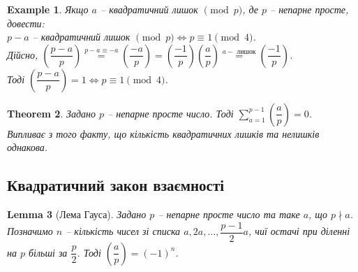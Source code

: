 \documentclass[a4paper, 14pt]{extarticle}
\theoremstyle{theoremdd}
\newtheorem{theorem}{Theorem}[subsection]
\theoremstyle{theoremdd}
\theoremstyle{theoremdd}
\theoremstyle{theoremdd}
\newtheorem{example}[theorem]{Example}
\theoremstyle{theoremdd}
\theoremstyle{theoremdd}
\theoremstyle{theoremdd}
\newtheorem{lemma}[theorem]{Lemma}
\theoremstyle{theoremdd}
\begin{document}
\begin{example}
Якщо $a$ -- квадратичний лишок $\pmod p$, де $p$ -- непарне просте, довести:\\
$p-a$ -- квадратичний лишок $\pmod p \iff p \equiv 1 \pmod 4$.\\
Дійсно, $\left( \dfrac{p-a}{p} \right) \overset{p-a \equiv -a}{=} \left( \dfrac{-a}{p} \right) = \left( \dfrac{-1}{p} \right) \left( \dfrac{a}{p} \right) \overset{a - \text{ лишок}}{=} \left( \dfrac{-1}{p} \right)$.\\
Тоді $\left( \dfrac{p-a}{p} \right) =1 \iff p \equiv 1 \pmod 4$.
\end{example}

\iffalse
\begin{example}
Знайти всі квадратичні лишкі $\pmod {19}$.
\end{example}
\fi

\begin{theorem}
Задано $p$ -- непарне просте число. Тоді $\displaystyle\sum_{a=1}^{p-1} \left( \dfrac{a}{p} \right) = 0$.\\
\textit{Випливає з того факту, що кількість квадратичних лишків та нелишків однакова.}
\end{theorem}

\subsection{Квадратичний закон взаємності}
\begin{lemma}[Лема Гауса]
Задано $p$ -- непарне просте число та таке $a$, що $p \nmid a$. Позначимо $n$ -- кількість чисел зі списка $a,2a,\dots, \dfrac{p-1}{2}a$, чиї остачі при діленні на $p$ більші за $\dfrac{p}{2}$. Тоді $\left( \dfrac{a}{p} \right) = (-1)^n$.
\end{lemma}
\end{document}
